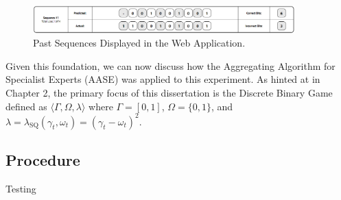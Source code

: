 \begin{figure}[h]
\centering
    \includegraphics[width=0.9\textwidth]{images/past_sequences.png}
    \caption{Past Sequences Displayed in the Web Application.}
\end{figure}

Given this foundation, we can now discuss how the Aggregating Algorithm for Specialist Experts (AASE) was applied to this experiment. As hinted at in Chapter 2, the primary focus of this dissertation is the Discrete Binary Game defined as $\langle \Gamma, \Omega, \lambda \rangle$ where $\Gamma = [0, 1]$, $\Omega = \{ 0, 1 \}$, and $\lambda = \lambda_{\text{SQ}}(\gamma_t, \omega_t) = (\gamma_t - \omega_t)^2$.

\subsection{Procedure}
Testing
\newpage